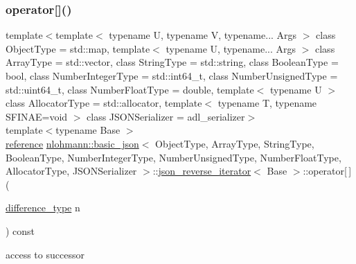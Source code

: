\subsubsection{\texorpdfstring{operator[]()}{operator[]()}}
{\footnotesize\ttfamily template$<$template$<$ typename U, typename V, typename... Args $>$ class Object\+Type = std\+::map, template$<$ typename U, typename... Args $>$ class Array\+Type = std\+::vector, class String\+Type  = std\+::string, class Boolean\+Type  = bool, class Number\+Integer\+Type  = std\+::int64\+\_\+t, class Number\+Unsigned\+Type  = std\+::uint64\+\_\+t, class Number\+Float\+Type  = double, template$<$ typename U $>$ class Allocator\+Type = std\+::allocator, template$<$ typename T, typename S\+F\+I\+N\+A\+E=void $>$ class J\+S\+O\+N\+Serializer = adl\+\_\+serializer$>$ \\
template$<$typename Base $>$ \\
\mbox{\hyperlink{classnlohmann_1_1basic__json_1_1json__reverse__iterator_ab0021ef2007fd338615360af404dcd4e}{reference}} \mbox{\hyperlink{classnlohmann_1_1basic__json}{nlohmann\+::basic\+\_\+json}}$<$ Object\+Type, Array\+Type, String\+Type, Boolean\+Type, Number\+Integer\+Type, Number\+Unsigned\+Type, Number\+Float\+Type, Allocator\+Type, J\+S\+O\+N\+Serializer $>$\+::\mbox{\hyperlink{classnlohmann_1_1basic__json_1_1json__reverse__iterator}{json\+\_\+reverse\+\_\+iterator}}$<$ Base $>$\+::operator\mbox{[}$\,$\mbox{]} (\begin{DoxyParamCaption}\item[{\mbox{\hyperlink{classnlohmann_1_1basic__json_afe7c1303357e19cea9527af4e9a31d8f}{difference\+\_\+type}}}]{n }\end{DoxyParamCaption}) const\hspace{0.3cm}{\ttfamily [inline]}}



access to successor 

